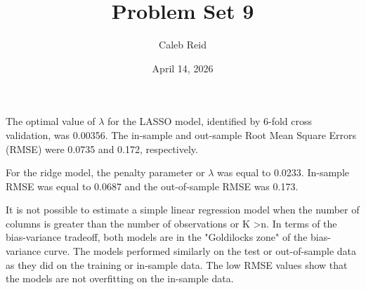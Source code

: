 \documentclass{article}
\title{Problem Set 9}
\date{April 14, 2026}
\author{Caleb Reid}
\begin{document}
\maketitle

The optimal value of $\lambda$  for the LASSO model, identified by 6-fold cross validation, was 0.00356. The in-sample and out-sample Root Mean Square Errors (RMSE) were 0.0735 and 0.172, respectively.

For the ridge model, the penalty parameter or $\lambda$ was equal to 0.0233. In-sample RMSE was equal to 0.0687 and the out-of-sample RMSE was 0.173.

It is not possible to estimate a simple linear regression model when the number of columns is greater than the number of observations or K \textgreater  n. In terms of the bias-variance tradeoff, both models are in the "Goldilocks zone" of the bias-variance curve. The models performed similarly on the test or out-of-sample data as they did on the training or in-sample data.  The low RMSE values show that the models are not overfitting on the in-sample data.
\end{document}
